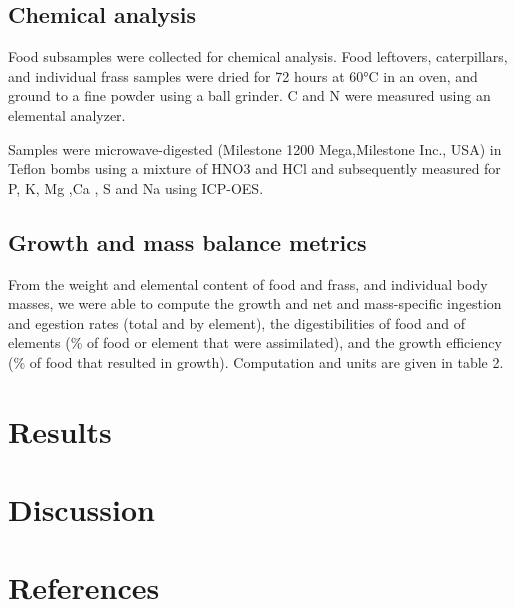 \documentclass[
  12pt,
]{article}
\begin{document}
\subsection{Chemical analysis}\label{chemical-analysis}

Food subsamples were collected for chemical analysis. Food leftovers,
caterpillars, and individual frass samples were dried for 72 hours at
60°C in an oven, and ground to a fine powder using a ball grinder. C and
N were measured using an elemental analyzer.

Samples were microwave-digested (Milestone 1200 Mega,Milestone Inc.,
USA) in Teflon bombs using a mixture of HNO3 and HCl and subsequently
measured for P, K, Mg ,Ca , S and Na using ICP-OES.

\subsection{Growth and mass balance
metrics}\label{growth-and-mass-balance-metrics}

From the weight and elemental content of food and frass, and individual
body masses, we were able to compute the growth and net and
mass-specific ingestion and egestion rates (total and by element), the
digestibilities of food and of elements (\% of food or element that were
assimilated), and the growth efficiency (\% of food that resulted in
growth). Computation and units are given in table 2.

\section{Results}\label{results}

\section{Discussion}\label{discussion}

\section{References}\label{references}
\end{document}
